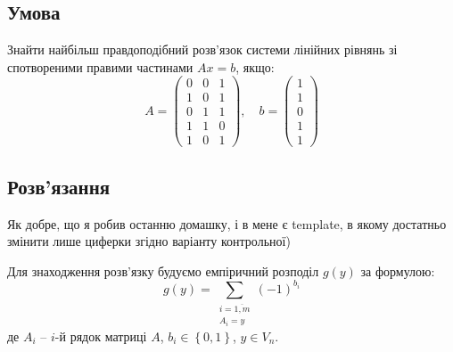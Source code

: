 \chapter{}
\label{chap:2}

\section{Умова}
Знайти найбільш правдоподібний розв'язок системи лінійних рівнянь зі спотвореними правими частинами $Ax = b$, якщо:
\begin{equation*}
    A = \begin{pmatrix}
        0 & 0 & 1 \\
        1 & 0 & 1 \\
        0 & 1 & 1 \\
        1 & 1 & 0 \\
        1 & 0 & 1
    \end{pmatrix}, \quad
    b = \begin{pmatrix}
        1 \\ 1 \\ 0 \\ 1 \\ 1
    \end{pmatrix}
\end{equation*}

\section{Розв'язання}
Як добре, що я робив останню домашку, і в мене є template, в якому достатньо змінити лише циферки згідно варіанту 
контрольної)

Для знаходження розв'язку будуємо емпіричний розподіл $g(y)$ за формулою:
\begin{equation*}
    g(y) = \sum\limits_{\substack{i = \overline{1, m} \\ A_i = y}} (-1)^{b_i}
\end{equation*}
де $A_i$ -- $i$-й рядок матриці $A$, $b_{i} \in \left\{0, 1\right\}$, $y \in V_{n}$.

